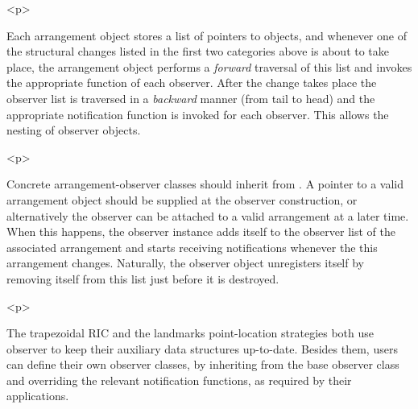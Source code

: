 \begin{ccHtmlOnly}<p>\end{ccHtmlOnly}
Each arrangement object stores a list of pointers to
 objects, and whenever one of the structural
changes listed in the first two categories above is about to take
place, the arrangement object performs a {\em forward} traversal
of this list and invokes the appropriate function of each
observer. After the change takes place the observer list is
traversed in a {\em backward} manner (from tail to head) and the
appropriate notification function is invoked for each observer.
This allows the nesting of observer objects.

\begin{ccHtmlOnly}<p>\end{ccHtmlOnly}
Concrete arrangement-observer classes should inherit from
. A pointer to a valid arrangement object should
be supplied at the observer construction, or alternatively the
observer can be attached to a valid arrangement at a later time.
When this happens, the observer instance adds itself to the
observer list of the associated arrangement and starts receiving
notifications whenever the this arrangement changes. Naturally,
the observer object unregisters itself by removing itself from
this list just before it is destroyed.

\begin{ccHtmlOnly}<p>\end{ccHtmlOnly}
The trapezoidal RIC and the landmarks point-location strategies
both use observer to keep their auxiliary data structures
up-to-date. Besides them, users can define their own observer
classes, by inheriting from the base observer class and overriding
the relevant notification functions, as required by their
applications.

